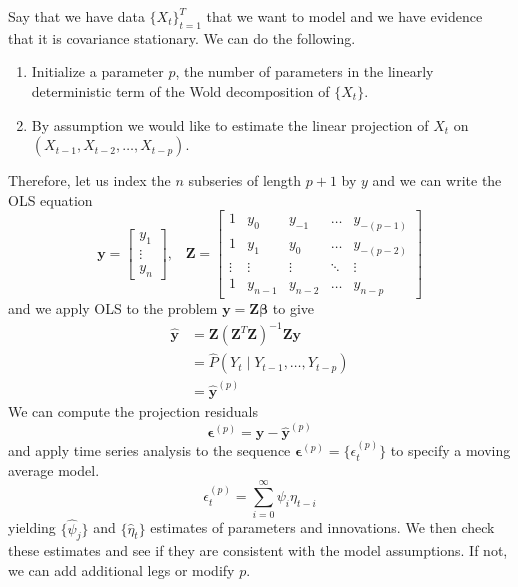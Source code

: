 \documentclass{article}
\begin{document}
  \begin{example}
    Say that we have data $\{X_t\}_{t=1}^T$ that we want to model and we have evidence that it is covariance stationary. We can do the following. 
    \begin{enumerate}
      \item Initialize a parameter $p$, the number of parameters in the linearly deterministic term of the Wold decomposition of $\{X_t\}$. 
      \item By assumption we would like to estimate the linear projection of $X_t$ on $(X_{t-1}, X_{t-2}, \ldots, X_{t-p})$. 
    \end{enumerate}
    Therefore, let us index the $n$ subseries of length $p+1$ by $y$ and we can write the OLS equation 
    \begin{equation}
      \mathbf{y} = \begin{bmatrix} y_1 \\ \vdots \\ y_n \end{bmatrix}, \;\;\; \mathbf{Z} = \begin{bmatrix} 
        1 & y_0 & y_{-1} & \ldots & y_{-(p-1)} \\
        1 & y_1 & y_{0} & \ldots & y_{-(p-2)} \\
        \vdots & \vdots & \vdots & \ddots & \vdots \\ 
        1 & y_{n-1} & y_{n-2} & \ldots & y_{n-p}
      \end{bmatrix}
    \end{equation}
    and we apply OLS to the problem $\mathbf{y} = \mathbf{Z} \boldsymbol{\beta}$ to give 
    \begin{align}
      \hat{\mathbf{y}} & = \mathbf{Z} (\mathbf{Z}^T \mathbf{Z})^{-1} \mathbf{Z} \mathbf{y} \\
                       & = \hat{P}(Y_t \mid Y_{t-1}, \ldots, Y_{t-p}) \\
                       & = \hat{\mathbf{y}}^{(p)}
    \end{align}
    We can compute the projection residuals 
    \begin{equation}
      \boldsymbol{\epsilon}^{(p)} = \mathbf{y} - \hat{\mathbf{y}}^{(p)}
    \end{equation}
    and apply time series analysis to the sequence $\boldsymbol{\epsilon}^{(p)} = \{ \epsilon^{(p)}_t \}$ to specify a moving average model. 
    \begin{equation}
      \epsilon^{(p)}_t = \sum_{i=0}^\infty \psi_i \eta_{t-i}
    \end{equation}
    yielding $\{\hat{\psi}_j\}$ and $\{\hat{\eta}_t \}$ estimates of parameters and innovations. We then check these estimates and see if they are consistent with the model assumptions. If not, we can add additional legs or modify $p$. 
  \end{example}
\end{document}
